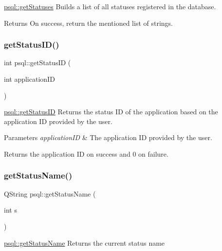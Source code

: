\mbox{\hyperlink{classpsql_a14854d28aabc7e658aea87a7b8b52e5c}{psql\+::get\+Statuses}} Builds a list of all statuses registered in the database. 

\begin{DoxyReturn}{Returns}
On success, return the mentioned list of strings. 
\end{DoxyReturn}
\mbox{\label{classpsql_a9c02c92c09cb60c35d24375673b7df06}} 
\subsubsection{\texorpdfstring{get\+Status\+I\+D()}{getStatusID()}}
{\footnotesize\ttfamily int psql\+::get\+Status\+ID (\begin{DoxyParamCaption}\item[{int}]{application\+ID }\end{DoxyParamCaption})}



\mbox{\hyperlink{classpsql_a9c02c92c09cb60c35d24375673b7df06}{psql\+::get\+Status\+ID}} Returns the status ID of the application based on the application ID provided by the user. 


\begin{DoxyParams}{Parameters}
{\em application\+ID} & The application ID provided by the user. \\
\hline
\end{DoxyParams}
\begin{DoxyReturn}{Returns}
the application ID on success and 0 on failure. 
\end{DoxyReturn}
\mbox{\label{classpsql_a5c2a64419a68a258071fd1f9a37c7c09}} 
\subsubsection{\texorpdfstring{get\+Status\+Name()}{getStatusName()}}
{\footnotesize\ttfamily Q\+String psql\+::get\+Status\+Name (\begin{DoxyParamCaption}\item[{int}]{s }\end{DoxyParamCaption})}



\mbox{\hyperlink{classpsql_a5c2a64419a68a258071fd1f9a37c7c09}{psql\+::get\+Status\+Name}} Returns the current status name 


